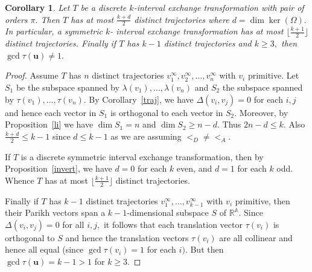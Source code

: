 \documentclass[12pt,a4paper]{amsart}
\newcommand{\reals}{{\mathbb R}}
\newcommand{\A}{{\mathbb A}}
\newtheorem{corollary}{Corollary}
\begin{document}



\begin{corollary}\label{k-1traj} Let $T$ be a discrete $k$-interval exchange transformation with  pair of orders $\pi.$  Then $T$ has at most $\frac{k+d}{2}$ distinct trajectories where $d=\dim\ker (\Omega).$ In particular,  a symmetric $k$- interval exchange transformation has at most $\lfloor \frac {k+1}{2} \rfloor$ distinct trajectories. Finally if $T$ has $k-1$ distinct trajectories and $k\geq 3,$ then $\gcd \tau (\mathbf u) \neq 1.$   \end{corollary}

\begin{proof}  Assume $T$ has $n$ distinct trajectories  $v_1^\infty,v_2^\infty, \ldots ,v_n^\infty$ with $v_i$ primitive.  Let $S_1$ be the subspace spanned by $\lambda ( v_1),\ldots ,\lambda (v_n)$ and $S_2$  the subspace spanned by $\tau(v_1),\ldots, \tau(v_n).$ By Corollary~\ref{traj}, we have $\Delta(v_i,v_j)=0$ for each $i,j$  and hence each vector in $S_1$ is orthogonal to each vector in $S_2.$ Moreover, by Proposition~\ref{li} we have $\dim S_1=n$ and $\dim S_2\geq n-d$.   Thus $2n-d\leq k.$
Also  $\frac{k+d}{2}\leq k-1$ since $d\leq k-1$ as we are assuming $<_D\neq <_A.$ 

If $T$ is a discrete symmetric interval exchange transformation, then by Proposition~\ref{invert}, we have  $d=0$ for each $k$ even, and $d=1$ for each $k$ odd. Whence $T$ has at most $\lfloor \frac {k+1}{2} \rfloor$ distinct trajectories.

 Finally if $T$ has $k-1$ distinct trajectories $v_1^\infty,\ldots,v_{k-1}^\infty$  with $v_i$ primitive, then their Parikh vectors span a $k-1$-dimensional subspace $S$ of $\reals ^{\A}.$ Since $\Delta(v_i,v_j)=0$ for all $i,j,$ it follows that each  translation vector $\tau(v_i)$ is orthogonal to $S$ and hence the translation vectors $\tau(v_i)$ are all collinear and hence all equal (since $\gcd \tau (v_i)=1$ for each $i).$ But then $\gcd \tau (\mathbf u) =k-1 >1$ for $k\geq 3.$ \end{proof}
 
\end{document}
